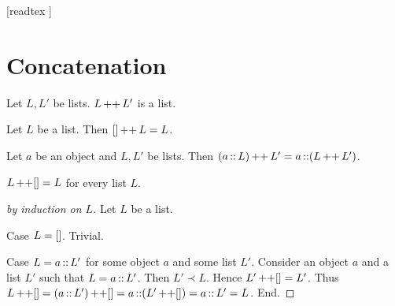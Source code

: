 \documentclass[10pt]{article}
\begin{document}
  \begin{imports}
    \begin{forthel}
      [readtex ]
    \end{forthel}
  \end{imports}


  \section*{Concatenation}

  \begin{forthel}
    \begin{signature}[id=LISTS_CONCAT_4578620297183232,printid]
      Let $L, L'$ be lists.
      $L \mathop{++} L'$ is a list.
    \end{signature}
  \end{forthel}

  \begin{forthel}
    \begin{axiom}[id=LISTS_CONCAT_3703161885818880,printid]
      Let $L$ be a list.
      Then $[] \mathop{++} L = L$.
    \end{axiom}
  \end{forthel}

  \begin{forthel}
    \begin{axiom}[id=LISTS_CONCAT_8050301789536256,printid]
      Let $a$ be an object and $L, L'$ be lists.
      Then $(a \mathop{::} L) \mathop{++} L' = a \mathop{::} (L \mathop{++} L')$.
    \end{axiom}
  \end{forthel}

  \begin{forthel}
    \begin{proposition}[id=LISTS_CONCAT_4512036658964875,printid]
      $L \mathop{++} [] = L$ for every list $L$.
    \end{proposition}
    \begin{proof}[by induction on $L$]
      Let $L$ be a list.

      Case $L = []$. Trivial.
      
      Case $L = a \mathop{::} L'$ for some object $a$ and some list $L'$.
        Consider an object $a$ and a list $L'$ such that $L = a \mathop{::} L'$.
        Then $L' \prec L$.
        Hence $L' \mathop{++} [] = L'$.
        Thus $L \mathop{++} []
          = (a \mathop{::} L') \mathop{++} []
          = a \mathop{::} (L' \mathop{++} [])
          = a \mathop{::} L'
          = L$.
      End.
    \end{proof}
  \end{forthel}
\end{document}
